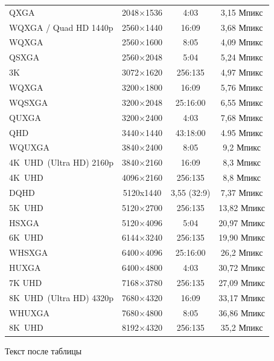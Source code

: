 \begin{VKRlongtable}
\begin{longtable}{|l|c|c|c|}
		QXGA & 2048×1536 & 4:03 & 3,15 Мпикс\\
		WQXGA / Quad HD 1440p & 2560×1440 & 16:09 & 3,68 Мпикс\\
		WQXGA & 2560×1600 & 8:05 & 4,09 Мпикс\\
		QSXGA & 2560×2048 & 5:04 & 5,24 Мпикс\\
		3K & 3072×1620 & 256:135 & 4,97 Мпикс\\
		WQXGA & 3200×1800 & 16:09 & 5,76 Мпикс\\
		WQSXGA & 3200×2048 & 25:16:00 & 6,55 Мпикс\\
		QUXGA & 3200×2400 & 4:03 & 7,68 Мпикс\\
		QHD & 3440×1440 & 43:18:00 & 4.95 Мпикс\\
		WQUXGA & 3840×2400 & 8:05 & 9,2 Мпикс\\
		4K UHD (Ultra HD) 2160p & 3840×2160 & 16:09 & 8,3 Мпикс\\
		4K UHD & 4096×2160 & 256:135 & 8,8 Мпикс\\
		DQHD & 5120x1440 & 3,55 (32:9) & 7,37 Мпикс\\
		5K UHD & 5120×2700 & 256:135 & 13,82 Мпикс\\
		HSXGA & 5120×4096 & 5:04 & 20,97 Мпикс\\
		6K UHD & 6144×3240 & 256:135 & 19,90 Мпикс\\
		WHSXGA & 6400×4096 & 25:16:00 & 26,2 Мпикс\\
		HUXGA & 6400×4800 & 4:03 & 30,72 Мпикс\\
		7K UHD & 7168×3780 & 256:135 & 27,09 Мпикс\\
		8K UHD (Ultra HD) 4320p & 7680×4320 & 16:09 & 33,17 Мпикс\\
		WHUXGA & 7680×4800 & 8:05 & 36,86 Мпикс\\
		8K UHD & 8192×4320 & 256:135 & 35,2 Мпикс\\ 		
	\end{longtable}
\end{VKRlongtable}

Текст после таблицы